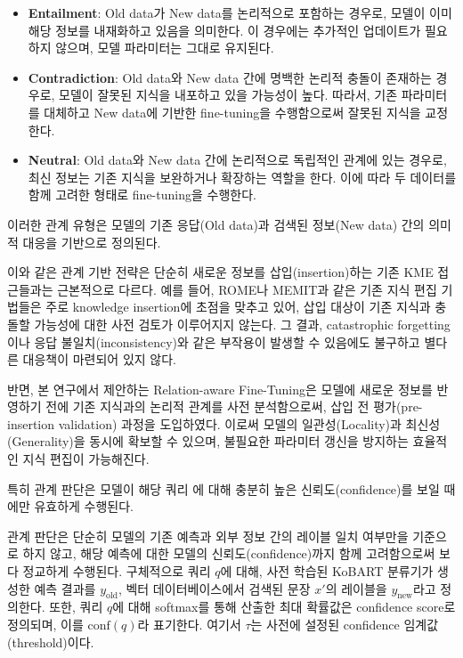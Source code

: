 \documentclass[a4paper,fleqn]{cas-sc}
\begin{document}
\begin{itemize}
    \item{\textbf{Entailment}:
    Old data가 New data를 논리적으로 포함하는 경우로, 모델이 이미 해당 정보를 내재화하고 있음을 의미한다. 이 경우에는 추가적인 업데이트가 필요하지 않으며, 모델 파라미터는 그대로 유지된다.}
    
    \item{\textbf{Contradiction}:
    Old data와 New data 간에 명백한 논리적 충돌이 존재하는 경우로, 모델이 잘못된 지식을 내포하고 있을 가능성이 높다. 따라서, 기존 파라미터를 대체하고 New data에 기반한 fine-tuning을 수행함으로써 잘못된 지식을 교정한다.}
    
    \item{\textbf{Neutral}:
    Old data와 New data 간에 논리적으로 독립적인 관계에 있는 경우로, 최신 정보는 기존 지식을 보완하거나 확장하는 역할을 한다. 이에 따라 두 데이터를 함께 고려한 형태로 fine-tuning을 수행한다.}

\end{itemize}  

이러한 관계 유형은 모델의 기존 응답(Old data)과 검색된 정보(New data) 간의 의미적 대응을 기반으로 정의된다.

이와 같은 관계 기반 전략은 단순히 새로운 정보를 삽입(insertion)하는 기존 KME 접근들과는 근본적으로 다르다. 예를 들어, ROME나 MEMIT과 같은 기존 지식 편집 기법들은 주로 knowledge insertion에 초점을 맞추고 있어, 삽입 대상이 기존 지식과 충돌할 가능성에 대한 사전 검토가 이루어지지 않는다. 그 결과, catastrophic forgetting이나 응답 불일치(inconsistency)와 같은 부작용이 발생할 수 있음에도 불구하고 별다른 대응책이 마련되어 있지 않다.

반면, 본 연구에서 제안하는 Relation-aware Fine-Tuning은 모델에 새로운 정보를 반영하기 전에 기존 지식과의 논리적 관계를 사전 분석함으로써, 삽입 전 평가(pre-insertion validation) 과정을 도입하였다. 이로써 모델의 일관성(Locality)과 최신성(Generality)을 동시에 확보할 수 있으며, 불필요한 파라미터 갱신을 방지하는 효율적인 지식 편집이 가능해진다.

특히 관계 판단은 모델이 해당 쿼리 에 대해 충분히 높은 신뢰도(confidence)를 보일 때에만 유효하게 수행된다.

관계 판단은 단순히 모델의 기존 예측과 외부 정보 간의 레이블 일치 여부만을 기준으로 하지 않고, 해당 예측에 대한 모델의 신뢰도(confidence)까지 함께 고려함으로써 보다 정교하게 수행된다. 
구체적으로 쿼리 \( q \)에 대해, 사전 학습된 KoBART 분류기가 생성한 예측 결과를 \( y_{\text{old}} \), 벡터 데이터베이스에서 검색된 문장 \( x' \)의 레이블을 \( y_{\text{new}} \)라고 정의한다. 또한, 쿼리 \( q \)에 대해 softmax를 통해 산출한 최대 확률값은 confidence score로 정의되며, 이를 \( \mathrm{conf}(q) \)라 표기한다.
여기서 \( \tau \)는 사전에 설정된 confidence 임계값(threshold)이다.  
\end{document}
